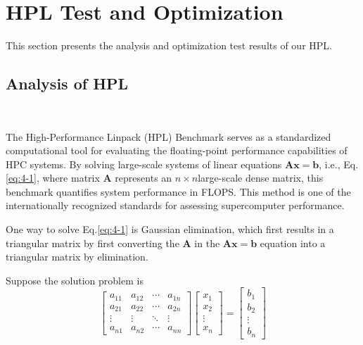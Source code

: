 \section{ HPL Test and Optimization}
This section presents the analysis and optimization test results of our HPL. 

\subsection{Analysis of HPL}
\ 

The High-Performance Linpack (HPL) Benchmark serves as a standardized computational tool for evaluating the floating-point performance capabilities of HPC systems. 
By solving large-scale systems of linear equations $\mathbf{Ax}{=}\mathbf{b}$, i.e., Eq.\ref{eq:4-1}, where matrix  $\mathbf{A}$ represents an  $n\times n $large-scale dense matrix, this benchmark quantifies system performance in FLOPS. 
This method is one of the internationally recognized standards for assessing supercomputer performance.

One way to solve Eq.\ref{eq:4-1} is Gaussian elimination, which first results in a triangular matrix by first converting the $\mathbf{A}$ in the $\mathbf{Ax}{=}\mathbf{b}$ equation into a triangular matrix by elimination.

Suppose the solution problem is
\begin{equation}
\begin{bmatrix}
a_{11} & a_{12} & \cdots & a_{1n} \\
a_{21} & a_{22} & \cdots & a_{2n} \\
\vdots & \vdots & \ddots & \vdots \\
a_{n1} & a_{n2} & \cdots & a_{nn}
\end{bmatrix}
\begin{bmatrix}
x_1 \\ x_2 \\ \vdots \\ x_n
\end{bmatrix}
=
\begin{bmatrix}
b_1 \\ b_2 \\ \vdots \\ b_n
\end{bmatrix}
\label{eq:4-1}
\end{equation}

